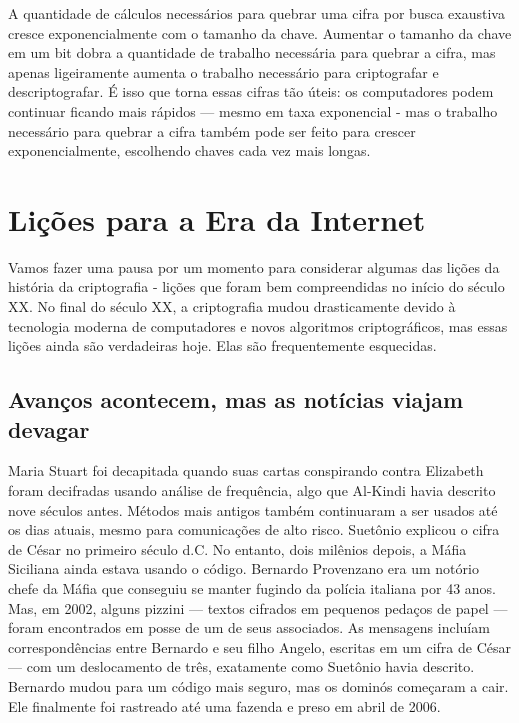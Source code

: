 \documentclass{book}
\begin{document}
A quantidade de cálculos necessários para quebrar uma cifra por busca exaustiva cresce exponencialmente com o tamanho da chave. Aumentar o tamanho da chave em um bit dobra a quantidade de trabalho necessária para quebrar a cifra, mas apenas ligeiramente aumenta o trabalho necessário para criptografar e descriptografar. É isso que torna essas cifras tão úteis: os computadores podem continuar ficando mais rápidos --- mesmo em taxa exponencial - mas o trabalho necessário para quebrar a cifra também pode ser feito para crescer exponencialmente, escolhendo chaves cada vez mais longas.


\section{Lições para a Era da Internet}
\label{segredos:licoes}

Vamos fazer uma pausa por um momento para considerar algumas das lições da história da criptografia - lições que foram bem compreendidas no início do século XX. No final do século XX, a criptografia mudou drasticamente devido à tecnologia moderna de computadores e novos algoritmos criptográficos, mas essas lições ainda são verdadeiras hoje. Elas são frequentemente esquecidas.

\subsection{Avanços acontecem, mas as notícias viajam devagar}
\label{segredos:avancos}

Maria Stuart foi decapitada quando suas cartas conspirando contra Elizabeth foram decifradas usando análise de frequência, algo que Al-Kindi havia descrito nove séculos antes. Métodos mais antigos também continuaram a ser usados até os dias atuais, mesmo para comunicações de alto risco. Suetônio explicou o cifra de César no primeiro século d.C. No entanto, dois milênios depois, a Máfia Siciliana ainda estava usando o código. Bernardo Provenzano era um notório chefe da Máfia que conseguiu se manter fugindo da polícia italiana por 43 anos. Mas, em 2002, alguns pizzini --- textos cifrados em pequenos pedaços de papel --- foram encontrados em posse de um de seus associados. As mensagens incluíam correspondências entre Bernardo e seu filho Angelo, escritas em um cifra de César --- com um deslocamento de três, exatamente como Suetônio havia descrito. Bernardo mudou para um código mais seguro, mas os dominós começaram a cair. Ele finalmente foi rastreado até uma fazenda e preso em abril de 2006.
\end{document}
